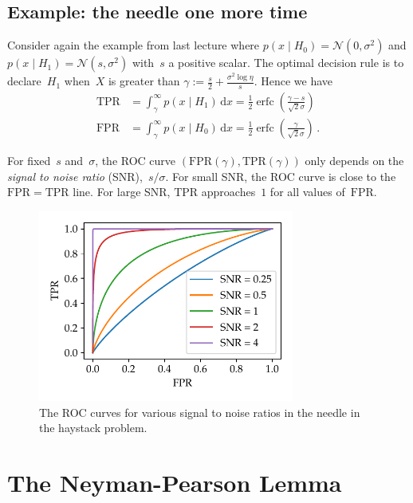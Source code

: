 \documentclass{tufte-book}
\begin{document}
\hypertarget{example-the-needle-one-more-time}{%
\subsection{Example: the needle one more
time}\label{example-the-needle-one-more-time}}

Consider again the example from last lecture where
\(p(x\mid H_0) = \mathcal{N}(0,\sigma^2)\) and
\(p(x\mid H_1) = \mathcal{N}(s,\sigma^2)\) with~\(s\) a positive scalar.
The optimal decision rule is to declare~\(H_1\) when~\(X\) is greater
than \(\gamma:= \frac{s}{2} + \frac{\sigma^2 \log \eta}{s}\). Hence we
have \[
\begin{aligned}
\mathrm{TPR} &= \int_{\gamma}^{\infty} p(x\mid H_1) \,\mathrm{d} x = \tfrac{1}{2} \operatorname{erfc} \left(\frac{\gamma-s}{\sqrt{2}\sigma}\right)\\
\mathrm{FPR} &= \int_{\gamma}^{\infty} p(x\mid H_0) \,\mathrm{d} x = \tfrac{1}{2} \operatorname{erfc} \left(\frac{\gamma}{\sqrt{2}\sigma}\right)\,.
\end{aligned}
\]

For fixed~\(s\) and~\(\sigma\), the ROC curve
\((\mathrm{FPR}(\gamma),\mathrm{TPR}(\gamma))\) only depends on the
\emph{signal to noise ratio} (SNR),~\(s/\sigma\). For small SNR, the ROC
curve is close to the~\(\mathrm{FPR}=\mathrm{TPR}\) line. For large SNR,
\(\mathrm{TPR}\) approaches~\(1\) for all values of~\(\mathrm{FPR}\).

\begin{figure}
\centering
\includegraphics[width=0.75\textwidth,height=\textheight]{assets/gaussian_roc}
\caption{The ROC curves for various signal to noise ratios in the needle
in the haystack problem.}
\end{figure}

\hypertarget{the-neyman-pearson-lemma}{%
\section{The Neyman-Pearson Lemma}\label{the-neyman-pearson-lemma}}
\end{document}
